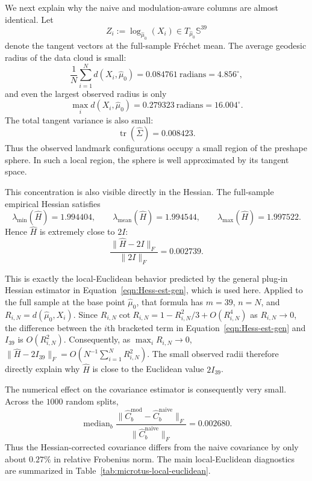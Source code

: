 \documentclass{amsart}
\theoremstyle{definition}
\theoremstyle{remark}
\newcommand\0{\boldsymbol{0}}
\begin{document}
We next explain why the naive and modulation-aware columns are almost identical.
Let
\[
Z_i:=\log_{\hat\mu_0}(X_i)\in T_{\hat\mu_0}\mathbb S^{39}
\]
denote the tangent vectors at the full-sample Fr\'echet mean.  The average
geodesic radius of the data cloud is small:
\[
\frac1N\sum_{i=1}^N d(X_i,\hat\mu_0)
=
0.084761\ \text{radians}
=
4.856^\circ,
\]
and even the largest observed radius is only
\[
\max_i d(X_i,\hat\mu_0)
=
0.279323\ \text{radians}
=
16.004^\circ.
\]
The total tangent variance is also small:
\[
\operatorname{tr}(\widehat\Sigma)=0.008423.
\]
Thus the observed landmark configurations occupy a small region of the preshape
sphere.  In such a local region, the sphere is well approximated by its tangent
space.

This concentration is also visible directly in the Hessian.  The full-sample
empirical Hessian satisfies
\[
\lambda_{\min}(\widehat H)=1.994404,\qquad
\lambda_{\mathrm{mean}}(\widehat H)=1.994544,\qquad
\lambda_{\max}(\widehat H)=1.997522.
\]
Hence \(\widehat H\) is extremely close to \(2I\):
\[
\frac{\|\widehat H-2I\|_F}{\|2I\|_F}
=
0.002739.
\]

This is exactly the local-Euclidean behavior predicted by the general plug-in
Hessian estimator in Equation~\eqref{eqn:Hess-est-gen}, which is used here.
Applied to the full sample at the base point \(\hat\mu_0\), that formula has
\(m=39\), \(n=N\), and \(R_{i,N}=d(\hat\mu_0,X_i)\).  Since
\(R_{i,N}\cot R_{i,N}
=1-R_{i,N}^2/3+O(R_{i,N}^4)\) as \(R_{i,N}\to0\), the difference between the
\(i\)th bracketed term in Equation~\eqref{eqn:Hess-est-gen} and \(I_{39}\) is
\(O(R_{i,N}^2)\). Consequently, as \(\max_i R_{i,N}\to0\),
\(\|\widehat H-2I_{39}\|_F
=O\!\left(N^{-1}\sum_{i=1}^N R_{i,N}^2\right)\).
The small observed radii therefore directly explain why \(\widehat H\) is close
to the Euclidean value \(2I_{39}\).

The numerical effect on the covariance estimator is consequently very small.
Across the \(1000\) random splits,
\[
\operatorname{median}_{b}
\frac{
\|\widehat C^{\mathrm{mod}}_b-\widehat C^{\mathrm{naive}}_b\|_F
}{
\|\widehat C^{\mathrm{naive}}_b\|_F
}
=
0.002680.
\]
Thus the Hessian-corrected covariance differs from the naive covariance by only
about \(0.27\%\) in relative Frobenius norm.  The main local-Euclidean
diagnostics are summarized in Table~\ref{tab:microtus-local-euclidean}.
\end{document}
